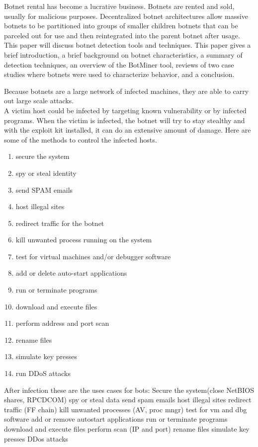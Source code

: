 Botnet rental has become a lucrative business. Botnets are rented and sold, usually for malicious purposes. Decentralized botnet architectures allow massive botnets to be partitioned into groups of smaller children botnets that can be parceled out for use and then reintegrated into the parent botnet after usage.
This paper will discuss botnet detection tools and techniques. This paper gives a brief introduction, a brief background on botnet characteristics, a summary of detection techniques, an overview of the BotMiner tool, reviews of two case studies where botnets were used to characterize behavior, and a conclusion.


Because botnets are a large network of infected machines, they are able to carry out large scale attacks.\\ 
A victim host could be infected by targeting known vulnerability or by infected programs. When the victim is infected, the botnet will try to stay stealthy and with the exploit kit installed, it can do an extensive amount of damage. Here are some of the methods to control the infected hosts.
\begin{enumerate}
\item secure the system
\item spy or steal identity
\item send SPAM emails
\item host illegal sites
\item redirect traffic for the botnet
\item kill unwanted process running on the system
\item test for virtual machines and/or debugger software
\item add or delete auto-start applications
\item run or terminate programs
\item download and execute files
\item perform address and port scan
\item rename files
\item simulate key presses
\item run DDoS attacks
\end{enumerate}


After infection these are the uses cases for bots: Secure the system(close NetBIOS shares,
RPCDCOM) spy or steal data send spam emails host illegal sites redirect traffic (FF chain) kill
unwanted processes (AV, proc mngr) test for vm and dbg software add or remove autostart
applications run or terminate programs download and execute files perform scan (IP and port)
rename files simulate key presses DDos attacks



